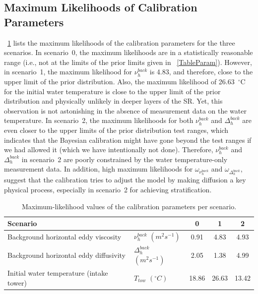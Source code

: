 \documentclass[draft,linenumbers,onecolumn]{agujournal2019} %
\begin{document}
\subsection{Maximum Likelihoods of Calibration Parameters}

\tablename{~\ref{tab:max_likelihood}} lists the maximum likelihoods of the calibration parameters for the three scenarios. In scenario~0, the maximum likelihoods are in a statistically reasonable range (i.e., not at the limits of the prior limits given in \tablename{~\ref{TableParam}}). However, in scenario~1, the maximum likelihood for $\nu_{h}^{back}$ is 4.83, and therefore, close to the upper limit of the prior distribution. Also, the maximum likelihood of 26.63~$^{\circ}$C for the initial water temperature is close to the upper limit of the prior distribution and physically unlikely in deeper layers of the SR. Yet, this observation is not astonishing in the absence of measurement data on the water temperature. In scenario~2, the maximum likelihoods for both $\nu_{h}^{back}$ and $\Delta_{h}^{back}$ are even closer to the upper limits of the prior distribution test ranges, which indicates that the Bayesian calibration might have gone beyond the test ranges if we had allowed it (which we have intentionally not done). Therefore, $\nu_{h}^{back}$ and $\Delta_{h}^{back}$ in scenario~2 are poorly constrained by the water temperature-only measurement data. In addition, high maximum likelihoods for $\omega_{\nu_{h}^{back}}$ and $\omega_{\Delta_{h}^{back}}$, suggest that the calibration tries to adjust the model by making diffusion a key physical process, especially in scenario~2 for achieving stratification.

\begin{table}
	\caption{Maximum-likelihood values of the calibration parameters per scenario.}
	\label{tab:max_likelihood}
	\centering
	\begin{tabular}{l l | c c c}%
		\hline
		\multicolumn{2}{l|}{Scenario}& 0 & 1 & 2\\
		\hline
		Background horizontal eddy viscosity & $\nu_{h}^{back}$ \((m^2s^{-1})\) &  0.91 & 4.83 & 4.93 \\
		Background horizontal eddy diffusivity & \(\Delta_{h}^{back}\) \( (m^2s^{-1})\) & 2.05 & 1.38 & 4.99 \\
		Initial water temperature (intake tower)& \(T_{tow}\)   \((^{\circ} C)\) & 18.86 & 26.63 & 13.42 \\
		\hline
	\end{tabular}
\end{table}
\end{document}

